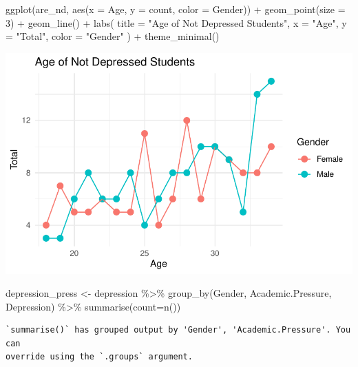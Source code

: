 \documentclass[
  letterpaper,
  DIV=11,
  numbers=noendperiod]{scrartcl}
\newenvironment{Shaded}{\begin{snugshade}}{\end{snugshade}}
\newcommand{\AttributeTok}[1]{\textcolor[rgb]{0.40,0.45,0.13}{#1}}
\newcommand{\DecValTok}[1]{\textcolor[rgb]{0.68,0.00,0.00}{#1}}
\newcommand{\FunctionTok}[1]{\textcolor[rgb]{0.28,0.35,0.67}{#1}}
\newcommand{\NormalTok}[1]{\textcolor[rgb]{0.00,0.23,0.31}{#1}}
\newcommand{\OtherTok}[1]{\textcolor[rgb]{0.00,0.23,0.31}{#1}}
\newcommand{\SpecialCharTok}[1]{\textcolor[rgb]{0.37,0.37,0.37}{#1}}
\newcommand{\StringTok}[1]{\textcolor[rgb]{0.13,0.47,0.30}{#1}}
\begin{document}
\begin{Shaded}
\begin{Highlighting}[]
\FunctionTok{ggplot}\NormalTok{(are\_nd, }\FunctionTok{aes}\NormalTok{(}\AttributeTok{x =}\NormalTok{ Age, }\AttributeTok{y =}\NormalTok{ count, }\AttributeTok{color =}\NormalTok{ Gender)) }\SpecialCharTok{+}
  \FunctionTok{geom\_point}\NormalTok{(}\AttributeTok{size =} \DecValTok{3}\NormalTok{) }\SpecialCharTok{+}    
  \FunctionTok{geom\_line}\NormalTok{() }\SpecialCharTok{+}       
  \FunctionTok{labs}\NormalTok{(}
    \AttributeTok{title =} \StringTok{"Age of Not Depressed Students"}\NormalTok{,}
    \AttributeTok{x =} \StringTok{"Age"}\NormalTok{,}
    \AttributeTok{y =} \StringTok{"Total"}\NormalTok{,}
    \AttributeTok{color =} \StringTok{"Gender"}
\NormalTok{  ) }\SpecialCharTok{+}
  \FunctionTok{theme\_minimal}\NormalTok{() }
\end{Highlighting}
\end{Shaded}

\includegraphics{Data_files/figure-pdf/unnamed-chunk-3-2.pdf}

\begin{Shaded}
\begin{Highlighting}[]
\NormalTok{depression\_press }\OtherTok{\textless{}{-}}\NormalTok{ depression }\SpecialCharTok{\%\textgreater{}\%} \FunctionTok{group\_by}\NormalTok{(Gender, Academic.Pressure, Depression) }\SpecialCharTok{\%\textgreater{}\%} \FunctionTok{summarise}\NormalTok{(}\AttributeTok{count=}\FunctionTok{n}\NormalTok{())}
\end{Highlighting}
\end{Shaded}

\begin{verbatim}
`summarise()` has grouped output by 'Gender', 'Academic.Pressure'. You can
override using the `.groups` argument.
\end{verbatim}
\end{document}
